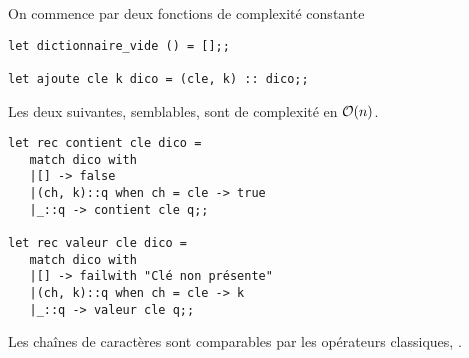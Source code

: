 \begin{Answer}
On commence par deux fonctions de complexité constante
\begin{lstlisting}
let dictionnaire_vide () = [];;

let ajoute cle k dico = (cle, k) :: dico;;
\end{lstlisting}

\newpage

Les deux suivantes, semblables, sont de complexité en ${\cal O}(n)$.
\begin{lstlisting}
let rec contient cle dico = 
   match dico with
   |[] -> false
   |(ch, k)::q when ch = cle -> true
   |_::q -> contient cle q;;

let rec valeur cle dico = 
   match dico with
   |[] -> failwith "Clé non présente"
   |(ch, k)::q when ch = cle -> k
   |_::q -> valeur cle q;;
\end{lstlisting}
\end{Answer}
Les chaînes de caractères sont comparables par les opérateurs classiques, \type{<, >, <=, >=}.

